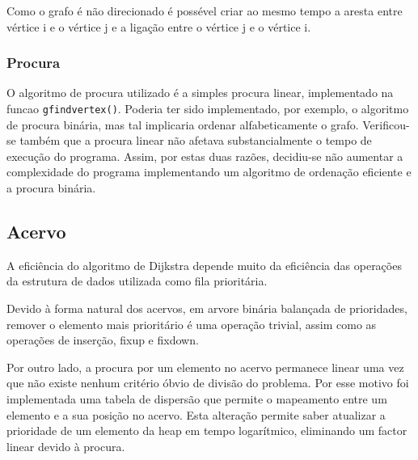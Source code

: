 \documentclass[portuguese, a4paper]{article}
\newcommand\tu[0]{\textunderscore}
\begin{document}
	\par
	Como o grafo é não direcionado é possével criar ao mesmo tempo a aresta
	entre vértice i e o vértice j e a ligação entre o vértice j e o vértice i.
	\subsubsection{Procura}
	\par
	O algoritmo de procura utilizado é a simples procura linear, implementado
	na funcao \texttt{g\tu find\tu vertex()}. Poderia ter sido implementado,
	por exemplo, o algoritmo de procura binária, mas tal implicaria ordenar
	alfabeticamente o grafo. Verificou-se também que a procura linear não
	afetava substancialmente o tempo de execução do programa. Assim, por estas
	duas razões, decidiu-se não aumentar a complexidade do programa
	implementando um algoritmo de ordenação eficiente e a procura binária.

	\subsection{Acervo}
	\par
	A eficiência do algoritmo de Dijkstra depende muito da eficiência das
	operações da estrutura de dados utilizada como fila prioritária.
	\par
	Devido à forma natural dos acervos, em arvore binária balançada de
	prioridades, remover o elemento mais prioritário é uma operação trivial,
	assim como as operações de inserção, fixup e fixdown.
	\par
	Por outro lado, a procura por um elemento no acervo permanece linear uma
	vez que não existe nenhum critério óbvio de divisão do problema. Por esse
	motivo foi implementada uma tabela de dispersão que permite o
	mapeamento entre um elemento e a sua posição no acervo.  Esta alteração
	permite saber atualizar a prioridade de um elemento da heap em tempo
	logarítmico, eliminando um factor linear devido à procura.
\end{document}

